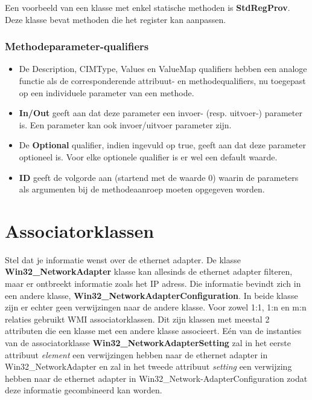 \documentclass{report}
\begin{document}
	Een voorbeeld van een klasse met enkel statische methoden is \textbf{StdRegProv}. Deze klasse bevat methoden die het register kan aanpassen. 
	
	\subsubsection{Methodeparameter-qualifiers}
		\begin{itemize}
			\item De Description, CIMType, Values en ValueMap qualifiers hebben een analoge functie als de corresponderende attribuut- en methodequalifiers, nu toegepast op een individuele parameter van een methode.
			\item \textbf{In/Out} geeft aan dat deze parameter een invoer- (resp. uitvoer-) parameter is. Een parameter kan ook invoer/uitvoer parameter zijn.
			\item De \textbf{Optional} qualifier, indien ingevuld op true, geeft aan dat deze parameter optioneel is. Voor elke optionele qualifier is er wel een default waarde.
			\item \textbf{ID} geeft de volgorde aan (startend met de waarde 0) waarin de parameters als argumenten bij de methodeaanroep moeten opgegeven worden.
		\end{itemize}
	
	\section{Associatorklassen}
	Stel dat je informatie wenst over de ethernet adapter. De klasse \textbf{Win32\_NetworkAdapter} klasse kan allesinds de ethernet adapter filteren, maar er ontbreekt informatie zoals het IP adress. Die informatie bevindt zich in een andere klasse, \textbf{Win32\_NetworkAdapterConfiguration}. In beide klasse zijn er echter geen verwijzingen naar de andere klasse. Voor zowel 1:1, 1:n en m:n relaties gebruikt WMI associatorklassen. Dit zijn klassen met meestal 2 attributen die een klasse met een andere klasse associeert. Eén van de instanties van de associatorklasse \textbf{Win32\_NetworkAdapterSetting} zal in het eerste attribuut \textit{element} een verwijzingen hebben naar de ethernet adapter in Win32\_NetworkAdapter en zal in het tweede attribuut \textit{setting} een verwijzing hebben naar de ethernet adapter in Win32\_Network-AdapterConfiguration zodat deze informatie gecombineerd kan worden.
	
\end{document}
